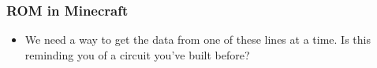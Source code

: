\documentclass{beamer}
\begin{document}
             \begin{frame}
             	\frametitle{ROM in Minecraft}
             	\begin{itemize}
             		\item We need a way to get the data from one of these lines at a time. Is this reminding you of a circuit you've built before?
             	\end{itemize}
             	
             	{
             	\centering
             	


\begin{tikzpicture}[x=0.75pt,y=0.75pt,yscale=-1,xscale=1]


\end{tikzpicture}}
\end{frame}
\end{document}
